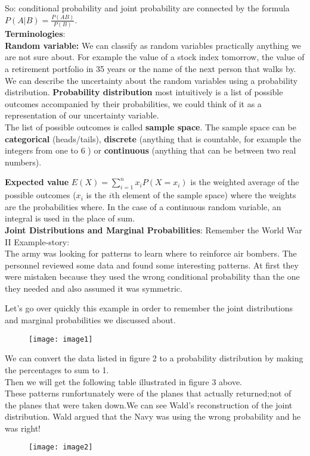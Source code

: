 \documentclass[12pt]{amsart}
\begin{document}
So: conditional probability and joint probability are connected by the formula $P(A|B)=\frac{P(AB)}{P(B)}$.\\


{\bf Terminologies}:\\

{\bf Random variable:} We can classify as random variables practically anything we are not sure about. For example the value of a stock index tomorrow, the value of a retirement portfolio in 35 years or the name of the next person that walks by.\\

We can describe the uncertainty about the random variables using a probability distribution.
{\bf Probability distribution} most intuitively is a list of possible outcomes accompanied by their probabilities, we could think of it as a representation of our uncertainty variable. \\

The list of possible outcomes is called {\bf sample space}. The sample space can be {\bf categorical} (heads/tails), {\bf discrete} (anything that is countable, for example the integers from one to 6 ) or {\bf continuous} (anything that can be between two real numbers).

{\bf Expected value} $E(X)=\displaystyle{\sum_{i=1}^nx_iP(X=x_i)}$  is the weighted average of the possible outcomes ($x_i$ is the $i$th element of the sample space) where the weights are the probabilities where. In the case of a continuous random variable, an integral is used in the place of sum. \\

{\bf Joint Distributions and Marginal Probabilities}:
Remember the World War II Example-story:\\
The army was looking for patterns to learn where to reinforce air bombers. The personnel reviewed some data and found some interesting patterns. At first they were mistaken because they used the wrong conditional probability than the one they needed and also assumed it was symmetric.

Let's go over quickly this example in order to remember the joint distributions and marginal probabilities we discussed about.
\newpage

  \begin{figure}[t]
\texttt{[image: image1]}
\caption{}
\end{figure}
 
 We can convert the data listed in figure 2 to a probability distribution by making the percentages to sum to 1.\\
 Then we will get the following table illustrated in figure 3 above.\\
 These patterns runfortunately were of the planes that actually returned;not of the planes that were taken down.We can see Wald's
 reconstruction of the joint distribution. Wald argued that the Navy was using the wrong probability and he was right!
  \begin{figure}[t]
\texttt{[image: image2]}
\caption{}
\end{figure}
 
\end{document}
